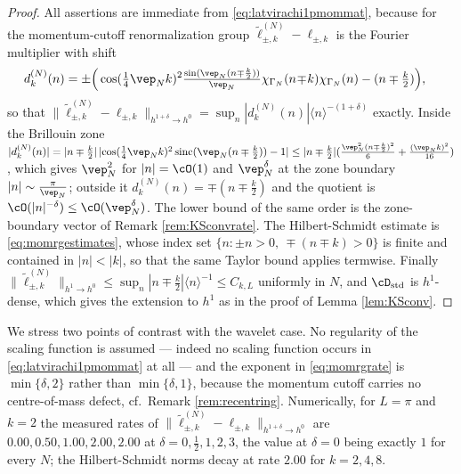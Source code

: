 \documentclass[a4paper, 11pt]{article}
\DeclareMathOperator{\1}{\mathds{1}}
\DeclareMathOperator{\sinc}{sinc}
\DeclareMathOperator{\std}{std}
\begin{document}
\begin{proof}
All assertions are immediate from \eqref{eq:latvirachi1pmommat}, because for the momentum-cutoff renormalization group $\tilde{\ell}^{(N)}_{\pm,k}-\ell_{\pm,k}$ is the Fourier multiplier with shift
\begin{align*}
d^{(N)}_{k}(n) & = \pm\Big(\cos(\tfrac{1}{4}\vep_{N}k)^{2}\tfrac{\sin(\vep_{N}(n\mp\frac{k}{2}))}{\vep_{N}}\chi_{\Gamma_{N}}(n\!\mp\!k)\chi_{\Gamma_{N}}(n) - (n\mp\tfrac{k}{2})\Big),
\end{align*}
so that $\|\tilde{\ell}^{(N)}_{\pm,k}-\ell_{\pm,k}\|_{h^{1+\delta}\rightarrow h^{0}} = \sup_{n}|d^{(N)}_{k}(n)|\langle n\rangle^{-(1+\delta)}$ exactly. Inside the Brillouin zone $|d^{(N)}_{k}(n)| = |n\mp\tfrac{k}{2}|\!\ |\!\cos(\tfrac{1}{4}\vep_{N}k)^{2}\sinc(\vep_{N}(n\mp\tfrac{k}{2}))-1| \leq |n\mp\tfrac{k}{2}|(\tfrac{\vep_{N}^{2}(n\mp\frac{k}{2})^{2}}{6}+\tfrac{(\vep_{N}k)^{2}}{16})$, which gives $\vep_{N}^{2}$ for $|n| = \cO(1)$ and $\vep_{N}^{\delta}$ at the zone boundary $|n|\sim\tfrac{\pi}{\vep_{N}}$; outside it $d^{(N)}_{k}(n) = \mp(n\mp\tfrac{k}{2})$ and the quotient is $\cO(|n|^{-\delta})\leq\cO(\vep_{N}^{\delta})$. The lower bound of the same order is the zone-boundary vector of Remark \ref{rem:KSconvrate}. The Hilbert-Schmidt estimate is \eqref{eq:momrgestimates}, whose index set $\{n:\pm n>0,\ \mp(n\mp k)>0\}$ is finite and contained in $|n|<|k|$, so that the same Taylor bound applies termwise. Finally $\|\tilde{\ell}^{(N)}_{\pm,k}\|_{h^{1}\rightarrow h^{0}}\leq\sup_{n}|n\mp\tfrac{k}{2}|\langle n\rangle^{-1}\leq C_{k,L}$ uniformly in $N$, and $\cD_{\std}$ is $h^{1}$-dense, which gives the extension to $h^{1}$ as in the proof of Lemma \ref{lem:KSconv}.
\end{proof}
We stress two points of contrast with the wavelet case. No regularity of the scaling function is assumed --- indeed no scaling function occurs in \eqref{eq:latvirachi1pmommat} at all --- and the exponent in \eqref{eq:momrgrate} is $\min\{\delta,2\}$ rather than $\min\{\delta,1\}$, because the momentum cutoff carries no centre-of-mass defect, cf.~Remark \ref{rem:recentring}. Numerically, for $L=\pi$ and $k=2$ the measured rates of $\|\tilde{\ell}^{(N)}_{\pm,k}-\ell_{\pm,k}\|_{h^{1+\delta}\rightarrow h^{0}}$ are $0.00, 0.50, 1.00, 2.00, 2.00$ at $\delta = 0,\tfrac{1}{2},1,2,3$, the value at $\delta=0$ being exactly $1$ for every $N$; the Hilbert-Schmidt norms decay at rate $2.00$ for $k=2,4,8$.
\end{document}

